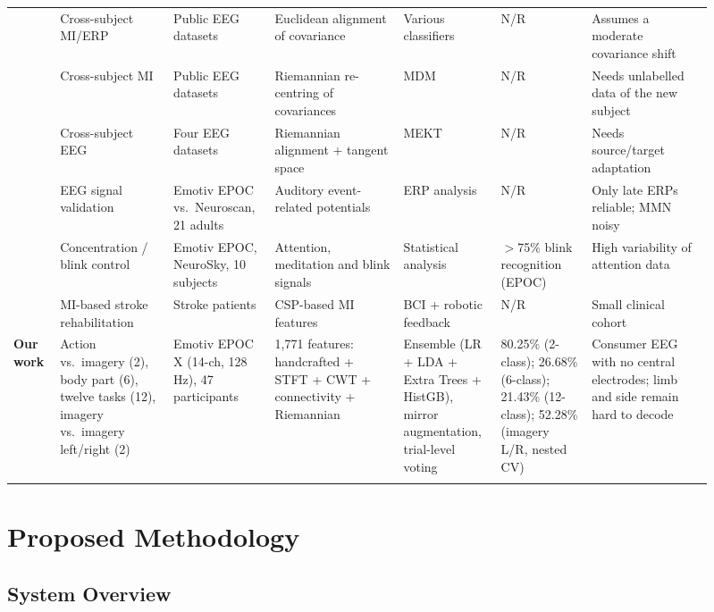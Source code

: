 \documentclass[pdflatex,sn-mathphys-num]{sn-jnl}%
\theoremstyle{thmstyleone}%
\theoremstyle{thmstyletwo}%
\theoremstyle{thmstylethree}%
\begin{document}
\begin{table}[t]
\begin{tabular}{@{}p{0.06\linewidth}p{0.15\linewidth}p{0.13\linewidth}p{0.17\linewidth}p{0.12\linewidth}p{0.12\linewidth}p{0.16\linewidth}@{}}
\cite{He2020} & Cross-subject MI/ERP & Public EEG datasets & Euclidean alignment of covariance & Various classifiers & N/R & Assumes a moderate covariance shift \\ \addlinespace
\cite{Zanini2018} & Cross-subject MI & Public EEG datasets & Riemannian re-centring of covariances & MDM & N/R & Needs unlabelled data of the new subject \\ \addlinespace
\cite{Zhang2020} & Cross-subject EEG & Four EEG datasets & Riemannian alignment + tangent space & MEKT & N/R & Needs source/target adaptation \\ \addlinespace
\cite{Badcock2013} & EEG signal validation & Emotiv EPOC vs.\ Neuroscan, 21 adults & Auditory event-related potentials & ERP analysis & N/R & Only late ERPs reliable; MMN noisy \\ \addlinespace
\cite{Maskeliunas2016} & Concentration / blink control & Emotiv EPOC, NeuroSky, 10 subjects & Attention, meditation and blink signals & Statistical analysis & $>$75\% blink recognition (EPOC) & High variability of attention data \\ \addlinespace
\cite{Ang2015} & MI-based stroke rehabilitation & Stroke patients & CSP-based MI features & BCI + robotic feedback & N/R & Small clinical cohort \\ \addlinespace
\textbf{Our work} & Action vs.\ imagery (2), body part (6), twelve tasks (12), imagery vs.\ imagery left/right (2) & Emotiv EPOC X (14-ch, 128 Hz), 47 participants & 1,771 features: handcrafted + STFT + CWT + connectivity + Riemannian & Ensemble (LR + LDA + Extra Trees + HistGB), mirror augmentation, trial-level voting & 80.25\% (2-class); 26.68\% (6-class); 21.43\% (12-class); 52.28\% (imagery L/R, nested CV) & Consumer EEG with no central electrodes; limb and side remain hard to decode \\
\botrule
\end{tabular}
\end{table}
\FloatBarrier

\section{Proposed Methodology}\label{sec:methods}

\subsection{System Overview}\label{subsec:overview}
\end{document}
